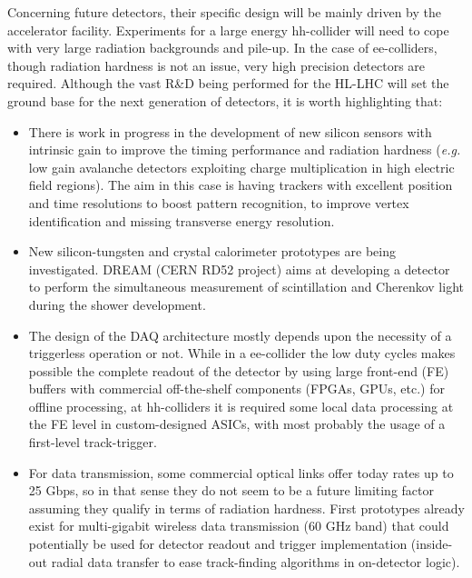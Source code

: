 Concerning future detectors, their specific design will be mainly driven by the accelerator facility. Experiments for a large energy hh-collider will need to cope with very large radiation backgrounds and pile-up. In the case of ee-colliders, though radiation hardness is not an issue, very high precision detectors are required. Although the vast R\&D being performed for the HL-LHC will set the ground base for the next generation of detectors, it is worth highlighting that:

\begin{itemize}

\item There is work in progress in the development of new silicon sensors with intrinsic gain to improve the timing performance and radiation hardness ({\em e.g.} low gain avalanche detectors exploiting charge multiplication in high electric field regions). The aim in this case is having trackers with excellent position and time resolutions to boost pattern recognition, to improve vertex identification and missing transverse energy resolution. 

\item New silicon-tungsten and crystal calorimeter prototypes are being investigated. DREAM (CERN RD52 project) aims at developing a detector to perform the simultaneous measurement of scintillation and Cherenkov light during the shower development.

\item The design of the DAQ architecture mostly depends upon the necessity of a triggerless operation or not. While in a ee-collider the low duty cycles makes possible the complete readout of the detector by using large front-end (FE) buffers with commercial off-the-shelf components (FPGAs, GPUs, etc.) for offline processing, at hh-colliders it is required some local data processing at the FE level in custom-designed ASICs, with most probably the usage of a first-level track-trigger. 

\item For data transmission, some commercial optical links offer today rates up to 25 Gbps, so in that sense they do not seem to be a future limiting factor assuming they qualify in terms of radiation hardness. First prototypes already exist for multi-gigabit wireless data transmission (60 GHz band) that could potentially be used for detector readout and trigger implementation (inside-out radial data transfer to ease track-finding algorithms in on-detector logic).

\end{itemize}

